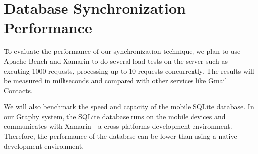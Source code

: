 \section{Database Synchronization Performance}
To evaluate the performance of our synchronization technique, we plan to use Apache Bench and Xamarin to do several load tests on the server such as excuting 1000 requests, processing up to 10 requests concurrently. The results will be measured in milliseconds and compared with other services like Gmail Contacts. 

We will also benchmark the speed and capacity of the mobile SQLite database. In our Graphy system, the SQLite database runs on the mobile devices and communicates with Xamarin - a cross-platforms development environment. Therefore, the performance of the database can be lower than using a native development environment.

%
